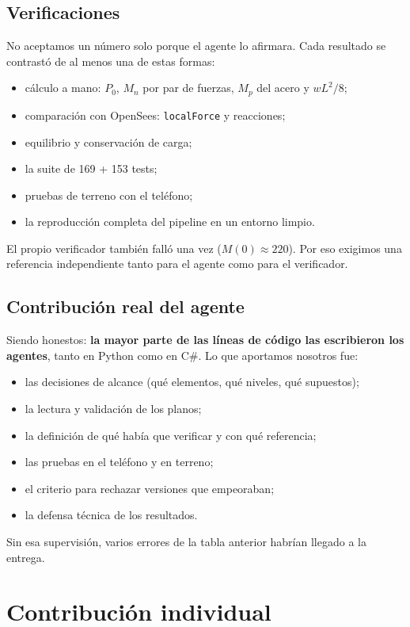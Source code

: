 \documentclass[11pt,a4paper]{article}
\begin{document}
\subsection{Verificaciones}

No aceptamos un número solo porque el agente lo afirmara. Cada resultado se
contrastó de al menos una de estas formas:
\begin{itemize}
  \item cálculo a mano: $P_0$, $M_n$ por par de fuerzas, $M_p$ del acero y
        $wL^2/8$;
  \item comparación con OpenSees: \texttt{localForce} y reacciones;
  \item equilibrio y conservación de carga;
  \item la suite de 169 + 153 tests;
  \item pruebas de terreno con el teléfono;
  \item la reproducción completa del pipeline en un entorno limpio.
\end{itemize}
El propio verificador también falló una vez ($M(0) \approx 220$). Por eso
exigimos una referencia independiente tanto para el agente como para el
verificador.

\subsection{Contribución real del agente}

Siendo honestos: \textbf{la mayor parte de las líneas de código las escribieron
los agentes}, tanto en Python como en C\#. Lo que aportamos nosotros fue:
\begin{itemize}
  \item las decisiones de alcance (qué elementos, qué niveles, qué supuestos);
  \item la lectura y validación de los planos;
  \item la definición de qué había que verificar y con qué referencia;
  \item las pruebas en el teléfono y en terreno;
  \item el criterio para rechazar versiones que empeoraban;
  \item la defensa técnica de los resultados.
\end{itemize}
Sin esa supervisión, varios errores de la tabla anterior habrían llegado a la
entrega.

\section{Contribución individual}
\end{document}
